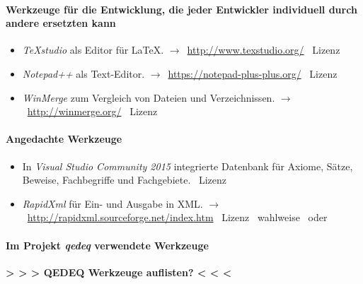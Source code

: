 \documentclass[english,ngerman,parskip=half,headsepline,footsepline]{scrreprt}
\newcounter{Enumi}
\begin{document}
	\paragraph{Werkzeuge für die Entwicklung, die jeder Entwickler individuell durch andere ersetzten kann}
	\begin{itemize}
		\setcounter{enumi}{\value{Enumi}}

		\item\label{Werkzeug:TeXstudio}\emph{\TeX studio} als Editor für \LaTeX. $\rightarrow$~\url{http://www.texstudio.org/} \textendash\ Lizenz \seename~\cite{bib:GPLii}

		\item\label{Werkzeug:Notepadpp}\emph{Notepad++} als Text-Editor. $\rightarrow$~\url{https://notepad-plus-plus.org/} \textendash\ Lizenz \seename~\cite{bib:GPLi}

		\item\label{Werkzeug:WinMerge}\emph{WinMerge} zum Vergleich von Dateien und Verzeichnissen. $\rightarrow$~\url{http://winmerge.org/} \textendash\ Lizenz \seename~\cite{bib:GPLi}

		\setcounter{Enumi}{\value{enumi}}
	\end{itemize}

	\paragraph{Angedachte Werkzeuge}
	\begin{itemize}
		\setcounter{enumi}{\value{Enumi}}

		\item\label{Werkzeug:VSC DB}In \emph{Visual Studio Community 2015} integrierte Datenbank für Axiome, Sätze, Beweise, Fachbegriffe und Fachgebiete. \textendash\ Lizenz \seename~\cite{bib:EULA}

		\item\label{Werkzeug:RapidXml}\emph{RapidXml} für Ein- und Ausgabe in XML. $\rightarrow$~\url{http://rapidxml.sourceforge.net/index.htm} \textendash\ Lizenz \seename\ wahlweise~\cite{bib:BSLi} oder~\cite{bib:MIT}

	\end{itemize}

	\paragraph{Im Projekt \emph{qedeq} verwendete Werkzeuge}

	\textbf{> > > QEDEQ Werkzeuge auflisten? < < <} %
\end{document}
